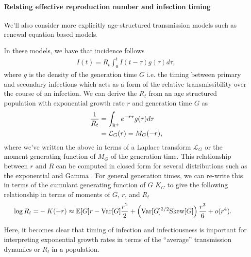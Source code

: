 \paragraph{Relating effective reproduction number and infection timing}%

We'll also consider more explicitly age-structured transmission models such as renewal equation based models.

In these models, we have that incidence follows
\begin{align}
  I(t) = R_{t} \int_{0}^{t} I(t-\tau) g(\tau) d\tau,
\end{align}
where $g$ is the density of the generation time $G$ i.e. the timing between primary and secondary infections which acts as a form of the relative transmissibility over the course of an infection.
We can derive the $R_{t}$ from an age structured population with exponential growth rate $r$ and generation time $G$ as
\begin{align}
  \frac{1}{R_{t}} &= \int_{\mathbb{R}^{+}} e^{-r\tau} g(\tau) d\tau\\
                  &=\mathcal{L}_{G}(r) = M_{G}(-r),
\end{align}
where we've written the above in terms of a Laplace transform $\mathcal{L}_{G}$ or the moment generating function of $M_{G}$ of the generation time.
This relationship between $r$ and $R$ can be computed in closed form for several distributions such as the exponential and Gamma \cite{Wallinga2006}.
For general generation times, we can re-write this in terms of the cumulant generating function of $G$ $K_{G}$ to give the following relationship in terms of moments of $G$, $r$, and $R_{t}$
\begin{align}
  \log R_{t} = &- K(-r) \approx \mathbb{E}[G] r - \text{Var}[G] \frac{r^{2}}{2} + \left( \text{Var}[G]^{3 / 2} \text{Skew}[G]\right) \frac{r^{3}}{6} + o(r^{4}). \label{eq:central_moment_R}
\end{align}

Here, it becomes clear that timing of infection and infectiousness is important for interpreting exponential growth rates in terms of the ``average'' transmission dynamics or $R_{t}$ in a population.


